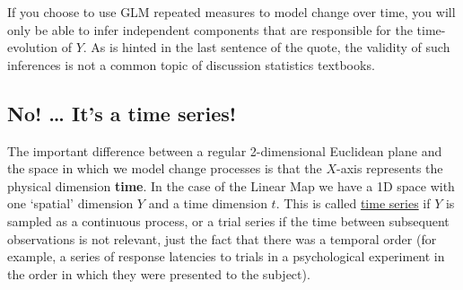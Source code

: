 \documentclass[]{book}
\begin{document}
If you choose to use GLM repeated measures to model change over time,
you will only be able to infer independent components that are
responsible for the time-evolution of \(Y\). As is hinted in the last
sentence of the quote, the validity of such inferences is not a common
topic of discussion statistics textbooks.

\subsection*{\texorpdfstring{\textbf{No! \ldots{} It's a time
series!}}{No! \ldots{} It's a time series!}}\label{no-its-a-time-series}

The important difference between a regular 2-dimensional Euclidean plane
and the space in which we model change processes is that the \(X\)-axis
represents the physical dimension \textbf{time}. In the case of the
Linear Map we have a 1D space with one `spatial' dimension \(Y\) and a
time dimension \(t\). This is called
\href{https://en.wikipedia.org/wiki/Time_series}{time series} if \(Y\)
is sampled as a continuous process, or a trial series if the time
between subsequent observations is not relevant, just the fact that
there was a temporal order (for example, a series of response latencies
to trials in a psychological experiment in the order in which they were
presented to the subject).
\end{document}
